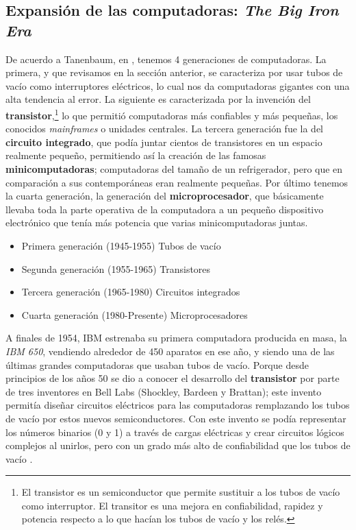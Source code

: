 \documentclass[letterpaper,12pt,oneside]{book}
\begin{document}
  
       
		
		
		
		\subsection{Expansión de las computadoras: \textit{The Big Iron Era}}
		
		
		De acuerdo a Tanenbaum, en \cite{tanenbaum_modern_2002}, tenemos 4 generaciones de computadoras. La primera, y que revisamos en la sección anterior, se caracteriza
		por usar tubos de vacío como interruptores eléctricos, lo cual nos da computadoras gigantes con una alta tendencia al error. La siguiente es caracterizada
		por la invención del \textbf{transistor},\footnote{El transistor es un semiconductor que permite sustituir a los tubos de vacío
		como interruptor. El transitor es una mejora en confiabilidad, rapidez y potencia respecto a lo que hacían los tubos de vacío y los relés.} lo que permitió computadoras más confiables y más pequeñas, los conocidos \textit{mainframes} o unidades centrales. La
		tercera generación fue la del \textbf{circuito integrado}, que podía juntar cientos de transistores en un espacio realmente pequeño, permitiendo así
		la creación de las famosas \textbf{minicomputadoras}; computadoras del tamaño de un refrigerador, pero que en comparación a sus contemporáneas eran realmente
		pequeñas. Por último tenemos la cuarta generación, la generación del \textbf{microprocesador}, que básicamente llevaba toda la parte operativa de la computadora
		a un pequeño dispositivo electrónico que tenía más potencia que varias minicomputadoras juntas.
		
		\begin{itemize}
			\item Primera generación (1945-1955) Tubos de vacío
			\item Segunda generación (1955-1965) Transistores
			\item Tercera generación (1965-1980) Circuitos integrados
			\item Cuarta generación (1980-Presente) Microprocesadores
		\end{itemize}
	
		
		
		A finales de 1954, IBM estrenaba su primera computadora producida en masa, la \textit{IBM 650}, vendiendo alrededor de 450 aparatos en ese año, y 
		siendo una
		de las últimas grandes computadoras que usaban tubos de vacío. Porque desde principios de los años 50 se dio a conocer el desarrollo del 
		\textbf{transistor}
		por parte de tres inventores en Bell Labs (Shockley, Bardeen y Brattan); este invento permitía  diseñar circuitos eléctricos para las
		computadoras remplazando los tubos de vacío por estos nuevos semiconductores. Con este invento se podía representar los números 
		binarios (0 y 1)
		 a través de cargas eléctricas y crear circuitos lógicos complejos al unirlos, pero con un grado más alto de confiabilidad que los tubos de vacío 
		 \cite{tanenbaum_modern_2002}.
    
\end{document}
